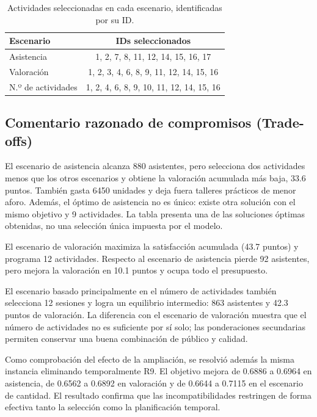 \begin{table}[htbp]
\centering
\caption{Actividades seleccionadas en cada escenario, identificadas por su ID.}
\label{tab:programaciones_escenarios}
\begin{tabular}{lc}
\toprule
\textbf{Escenario} & \textbf{IDs seleccionados} \\
\midrule
Asistencia & 1, 2, 7, 8, 11, 12, 14, 15, 16, 17 \\
Valoración & 1, 2, 3, 4, 6, 8, 9, 11, 12, 14, 15, 16 \\
N.º de actividades & 1, 2, 4, 6, 8, 9, 10, 11, 12, 14, 15, 16 \\
\bottomrule
\end{tabular}
\end{table}

\subsection{Comentario razonado de compromisos (Trade-offs)}

El escenario de asistencia alcanza 880 asistentes, pero selecciona dos
actividades menos que los otros escenarios y obtiene la valoración acumulada
más baja, 33.6 puntos. También gasta 6450 unidades y deja fuera talleres
prácticos de menor aforo.
Además, el óptimo de asistencia no es único: existe otra solución con el mismo
objetivo y 9 actividades. La tabla presenta una de las soluciones óptimas
obtenidas, no una selección única impuesta por el modelo.

El escenario de valoración maximiza la satisfacción acumulada (43.7 puntos) y
programa 12 actividades. Respecto al escenario de asistencia pierde 92 asistentes,
pero mejora la valoración en 10.1 puntos y ocupa todo el presupuesto.

El escenario basado principalmente en el número de actividades también
selecciona 12 sesiones y logra un equilibrio intermedio: 863 asistentes y
42.3 puntos de valoración. La diferencia con el escenario de valoración muestra
que el número de actividades no es suficiente por sí solo; las ponderaciones
secundarias permiten conservar una buena combinación de público y calidad.

Como comprobación del efecto de la ampliación, se resolvió además la misma
instancia eliminando temporalmente R9. El objetivo mejora de 0.6886 a 0.6964
en asistencia, de 0.6562 a 0.6892 en valoración y de 0.6644 a 0.7115 en el
escenario de cantidad. El resultado confirma que las incompatibilidades
restringen de forma efectiva tanto la selección como la planificación temporal.


